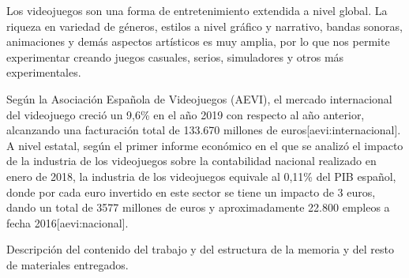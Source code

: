 Los videojuegos son una forma de entretenimiento extendida a nivel global. La riqueza en variedad de géneros, estilos a nivel gráfico y narrativo, bandas sonoras, animaciones y demás aspectos artísticos es muy amplia, por lo que nos permite experimentar creando juegos casuales, serios, simuladores y otros más experimentales.

Según la Asociación Española de Videojuegos (AEVI), el mercado internacional del videojuego creció un 9,6\% en el año 2019 con respecto al año anterior, alcanzando una facturación total de 133.670 millones de euros[aevi:internacional]. A nivel estatal, según el primer informe económico en el que se analizó el impacto de la industria de los videojuegos sobre la contabilidad nacional realizado en enero de 2018, la industria de los videojuegos equivale al 0,11\% del PIB español, donde por cada euro invertido en este sector se tiene un impacto de 3 euros, dando un total de 3577 millones de euros y aproximadamente 22.800 empleos a fecha 2016[aevi:nacional]. 



Descripción del contenido del trabajo y del estructura de la memoria y del resto de materiales entregados.

